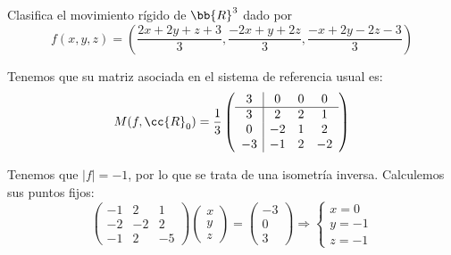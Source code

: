 \begin{ejercicio}
    Clasifica el movimiento rígido de $\bb{R}^3$ dado por
    \begin{equation*}
        f(x,y,z) = \left(
        \frac{2x+2y+z+3}{3}, \frac{-2x+y+2z}{3}, \frac{-x+2y-2z-3}{3}
        \right)
    \end{equation*}

    Tenemos que su matriz asociada en el sistema de referencia usual es:
    \begin{equation*}
        M(f, \cc{R}_0) = \frac{1}{3}\left(
        \begin{array}{c|ccc}
            3 & 0 & 0 & 0 \\ \hline
            3 & 2 & 2 & 1 \\
            0 & -2 & 1 & 2 \\
            -3 & -1 & 2 & -2
        \end{array}
        \right)
    \end{equation*}

    Tenemos que $|f| = -1$, por lo que se trata de una isometría inversa. Calculemos sus puntos fijos:
    \begin{equation*}
        \left(
        \begin{array}{ccc}
            -1 & 2 & 1 \\
            -2 & -2 & 2 \\
            -1 & 2 & -5
        \end{array}
        \right)
        \left(
        \begin{array}{c}
            x \\ y \\ z
        \end{array}
        \right)
        = \left(
        \begin{array}{c}
            -3 \\ 0 \\ 3
        \end{array}
        \right)
        \Longrightarrow \left\{\begin{array}{l}
            x = 0\\
            y = -1\\
            z = -1
        \end{array}\right.
    \end{equation*}


\end{ejercicio}
